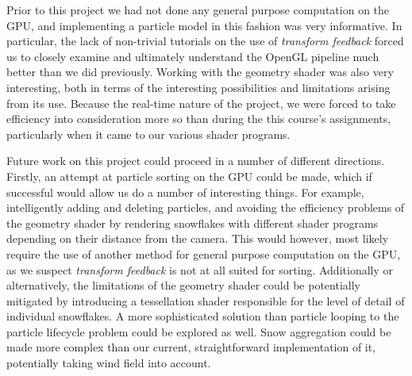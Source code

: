 \documentclass[conference]{acmsiggraph}
\begin{document}
Prior to this project we had not done any general purpose computation on the GPU, and implementing a particle model in this fashion was very informative. In particular, the lack of non-trivial tutorials on the use of \textit{transform feedback} forced us to closely examine and ultimately understand the OpenGL pipeline much better than we did previously. Working with the geometry shader was also very interesting, both in terms of the interesting possibilities and limitations arising from its use. Because the real-time nature of the project, we were forced to take efficiency into consideration more so than during the this course's assignments, particularly when it came to our various shader programs.

Future work on this project could proceed in a number of different directions. Firstly, an attempt at particle sorting on the GPU could be made, which if successful would allow us do a number of interesting things. For example, intelligently adding and deleting particles, and avoiding the efficiency problems of the geometry shader by rendering snowflakes with different shader programs depending on their distance from the camera. This would however, most likely require the use of another method for general purpose computation on the GPU, as we suspect \textit{transform feedback} is not at all suited for sorting. Additionally or alternatively, the limitations of the geometry shader could be potentially mitigated by introducing a tessellation shader responsible for the level of detail of individual snowflakes. A more sophisticated solution than particle looping to the particle lifecycle problem could be explored as well. Snow aggregation could be made more complex than our current, straightforward implementation of it, potentially taking wind field into account.


\nocite{*}

\end{document}
